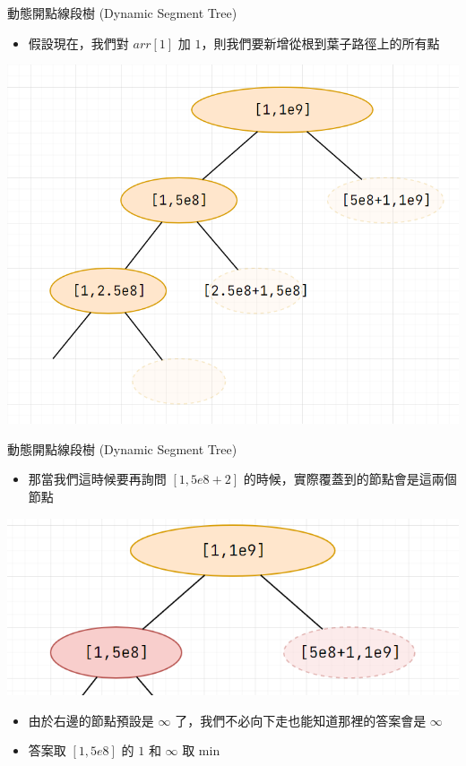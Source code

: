 \documentclass[aspectratio=169]{beamer}
\begin{document}
    \begin{frame}{動態開點線段樹 (Dynamic Segment Tree)}
        \begin{itemize}
            \item 假設現在，我們對 $arr[1]$ 加 $1$，則我們要新增從根到葉子路徑上的所有點
        \end{itemize}
        \begin{center}
            \includegraphics[scale=0.3]{dynamic/add1.png}
        \end{center}
    \end{frame}

    \begin{frame}{動態開點線段樹 (Dynamic Segment Tree)}
        \begin{itemize}
            \item 那當我們這時候要再詢問 $[1,5e8+2]$ 的時候，實際覆蓋到的節點會是這兩個節點
        \end{itemize}
        \begin{center}
            \includegraphics[scale=0.3]{dynamic/ask1.png}
        \end{center}
        \begin{itemize}
            \item 由於右邊的節點預設是 $\infty$ 了，我們不必向下走也能知道那裡的答案會是 $\infty$
            \item 答案取 $[1,5e8]$ 的 $1$ 和 $\infty$ 取 min
        \end{itemize}
    \end{frame}
\end{document}
